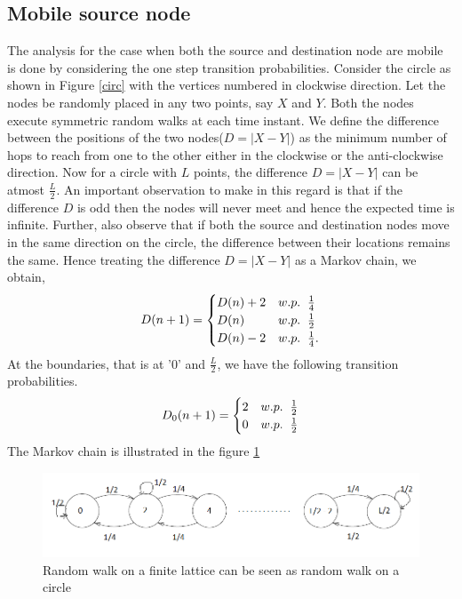 \documentclass[a4paper,10pt,english]{article}
\begin{document}
\subsection{Mobile source node}
 The analysis for the case when both the source and destination node are mobile is done by considering the one step transition probabilities. Consider the circle as shown in Figure \ref{circ} with the vertices numbered in clockwise direction. Let the nodes be randomly placed in any two points, say $X$ and $Y$. Both the nodes execute symmetric random walks at each time instant. We define the difference between the positions of the two nodes($D=|X-Y|$) as the minimum number of hops to reach from one to the other either in the clockwise or the anti-clockwise direction. Now for a circle with $L$ points, the difference $D=|X-Y|$ can be atmost $\frac{L}{2}$. An important observation to make in this regard is that if the difference $D$ is odd then the nodes will never meet and hence the expected time is infinite. Further, also observe that if both the source and destination nodes move in the same direction on the circle, the difference between their locations remains the same. Hence treating the difference $D=|X-Y|$ as a Markov chain, we obtain,
\begin{equation}
D(n+1)=
\begin{cases}
D(n)+2 & w.p. \hspace{0.2cm} \frac{1}{4}\\
D(n) & w.p. \hspace{0.2cm} \frac{1}{2}\\
D(n)-2 & w.p. \hspace{0.2cm} \frac{1}{4}.
\end{cases}
\end{equation}
At the boundaries, that is at '0' and $\frac{L}{2}$, we have the following transition probabilities.
\begin{equation}
D_0(n+1)=
\begin{cases}
2 & w.p. \hspace{0.2cm} \frac{1}{2}\\
0 & w.p. \hspace{0.2cm} \frac{1}{2}
\end{cases}
\end{equation}
The Markov chain is illustrated in the figure \ref{mc}
\begin{figure}
	\centering
	\includegraphics[scale = 0.5]{markovchain.png}
	\caption{Random walk on a finite lattice can be seen as random walk on a circle}
	\label{mc}
\end{figure}
\end{document}
